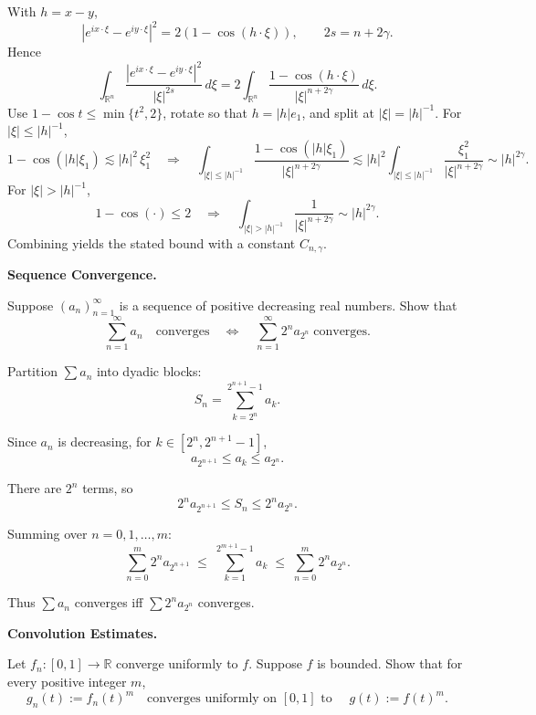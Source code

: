 \begin{solution}
With $h=x-y$,
\[
|e^{ix\cdot\xi}-e^{iy\cdot\xi}|^2=2(1-\cos(h\cdot\xi)),
\qquad
2s=n+2\gamma.
\]
Hence
\[
\int_{\mathbb R^n}\frac{|e^{ix\cdot\xi}-e^{iy\cdot\xi}|^2}{|\xi|^{2s}}\,d\xi
=2\!\int_{\mathbb R^n}\frac{1-\cos(h\cdot\xi)}{|\xi|^{n+2\gamma}}\,d\xi.
\]
Use $1-\cos t\le \min\{t^2,2\}$, rotate so that $h=|h|e_1$, and split at $|\xi|=|h|^{-1}$.
For $|\xi|\le |h|^{-1}$,
\[
1-\cos(|h|\xi_1)\lesssim |h|^2\,\xi_1^2
\quad\Rightarrow\quad
\int_{|\xi|\le |h|^{-1}}\frac{1-\cos(|h|\xi_1)}{|\xi|^{n+2\gamma}}
\lesssim |h|^2 \int_{|\xi|\le |h|^{-1}}\frac{\xi_1^2}{|\xi|^{n+2\gamma}}
\sim |h|^{2\gamma}.
\]
For $|\xi|>|h|^{-1}$,
\[
1-\cos(\cdot)\le 2
\quad\Rightarrow\quad
\int_{|\xi|>|h|^{-1}}\frac{1}{|\xi|^{n+2\gamma}}
\sim |h|^{2\gamma}.
\]
Combining yields the stated bound with a constant $C_{n,\gamma}$.
\end{solution}

\begin{problem}[CP-II-0106]
\label{prob:cp-ii-0106}
\textbf{Sequence Convergence.}

\hspace*{1.5em}Suppose $(a_n)_{n=1}^\infty$ is a sequence of positive decreasing real numbers.
Show that
\[
\sum_{n=1}^\infty a_n \quad\text{converges} \quad\iff\quad \sum_{n=1}^\infty 2^n a_{2^n}\;\text{converges}.
\]
\end{problem}

\begin{solution}
Partition $\sum a_n$ into dyadic blocks:
	\[
	S_n = \sum_{k=2^n}^{2^{n+1}-1} a_k.
	\]

	Since $a_n$ is decreasing, for $k\in[2^n,2^{n+1}-1]$,
	\[
	a_{2^{n+1}} \leq a_k \leq a_{2^n}.
	\]

	There are $2^n$ terms, so
	\[
	2^n a_{2^{n+1}} \leq S_n \leq 2^n a_{2^n}.
	\]

	Summing over $n=0,1,\dots,m$:
	\[
	\sum_{n=0}^m 2^n a_{2^{n+1}} \;\leq\; \sum_{k=1}^{2^{m+1}-1} a_k \;\leq\; \sum_{n=0}^m 2^n a_{2^n}.
	\]

	Thus $\sum a_n$ converges iff $\sum 2^n a_{2^n}$ converges.
\end{solution}

\begin{problem}[CP-II-0107]
\label{prob:cp-ii-0107}
\textbf{Convolution Estimates.}

	Let $f_n:[0,1]\to\mathbb R$ converge uniformly to $f$. Suppose $f$ is bounded.
	Show that for every positive integer $m$,
	\[
	g_n(t):=f_n(t)^m \quad\text{converges uniformly on }[0,1]\text{ to }\quad
	g(t):=f(t)^m.
	\]
\end{problem}

